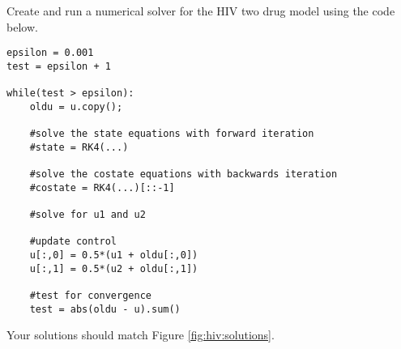 \label{problem:hiv:costateequations}

Create and run a numerical solver for the HIV two drug model using the code below.

\begin{lstlisting}
epsilon = 0.001
test = epsilon + 1

while(test > epsilon):
	oldu = u.copy();
    
	#solve the state equations with forward iteration
	#state = RK4(...)
    
	#solve the costate equations with backwards iteration
	#costate = RK4(...)[::-1]
	
	#solve for u1 and u2
    
	#update control
	u[:,0] = 0.5*(u1 + oldu[:,0])
	u[:,1] = 0.5*(u2 + oldu[:,1])

	#test for convergence
	test = abs(oldu - u).sum()
\end{lstlisting}

Your solutions should match Figure \ref{fig:hiv:solutions}.
\label{problem:hiv:solver}

\label{problem:hiv:numericalsolver}
